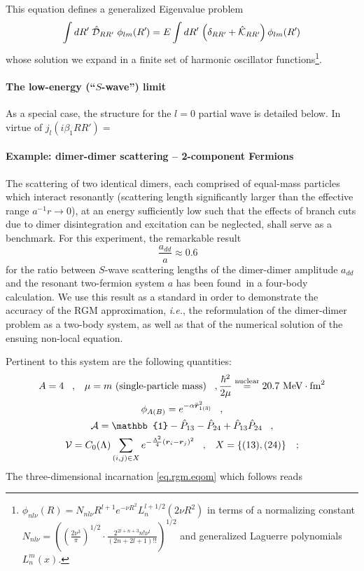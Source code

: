 \documentclass[onecolumn,preprint,superscriptaddress,nofootinbib,notitlepage,10pt,linenumbers]{revtex4-1}
\newcommand*{\mprime}{^{\prime}\mkern-1.2mu}
\newcommand{\la}{\label}
\newcommand{\be}{\begin{equation}}
\newcommand{\ee}{\end{equation}}
\newcommand{\vcl}[1]{\ensuremath{\bar{\boldsymbol{r}}_\text{\tiny #1}}}
\newcommand{\ie}{\textit{i.e.}\;}
\newcommand{\ve}[1]{\ensuremath{\boldsymbol{#1}}}
\newcommand{\cc}{\ensuremath C_0(\Lambda)}
\begin{document}
This equation defines a generalized Eigenvalue problem
\be\la{eq.rgm.gev}
\int dR\mprime~\hat{\mathcal{D}}_{RR\mprime}~\phi_{lm}(R\mprime)=
E\int dR\mprime\,\left(\delta_{RR\mprime}+\hat{\mathcal{K}}_{RR\mprime}\right)
\phi_{lm}(R\mprime)
\ee
whose solution we expand in a finite set of harmonic oscillator
functions\footnote{
$\phi_{nl\nu}(R)=N_{nl\nu}R^{l+1}e^{-\nu R^2}L_{n}^{l+1/2}(2\nu R^2)$
in terms of a normalizing constant $N_{nl\nu}=
\left(\left(\frac{2\nu^3}{\pi}\right)^{1/2}\cdot\frac{2^{2l+n+3}n!\nu^l}{(2n+2l+1)!!}\right)^{1/2}$ and generalized
Laguerre polynomials $L_n^m(x)$.
}.

\paragraph{The low-energy (``$S$-wave'') limit}
As a special case, the structure for the $l=0$ partial wave is detailed below. In virtue of $j_{l}(i\beta_1 RR')=$

\newpage
\paragraph{Example: dimer-dimer scattering -- 2-component Fermions}
The scattering of two identical dimers, each comprised of equal-mass particles which interact resonantly (scattering length significantly larger
than the effective range $a^{-1}r\to 0$), at an energy sufficiently low such that the effects of branch cuts due to dimer disintegration and
excitation can be neglected, shall serve as a benchmark. For this experiment, the remarkable result
\be
\frac{a_{dd}}{a}\approx 0.6\;\;\;
\ee
for the ratio between $S$-wave scattering
lengths of the dimer-dimer amplitude $a_{dd}$ and the resonant two-fermion system $a$ has been found\cite{petrov_dimerov}~in
a four-body calculation.
We use this result as a standard in order to demonstrate the accuracy of the RGM approximation, \ie, the reformulation of the dimer-dimer
problem as a two-body system, as well as that of the numerical solution of the ensuing non-local equation.

Pertinent to this system are the following quantities:
\begin{gather}
A=4\;\;\;,\;\;\;\mu=m~\text{(single-particle mass)}\;\;\;,\frac{\hbar^2}{2\mu}\stackrel{\text{nuclear}}{=}20.7~\text{MeV}\cdot\text{fm}^2\\
\phi_{A(B)}=e^{-\alpha\vcl{1(3)}^2}\;\;\;,\\
\mathcal{A}=\mathbb{1}-\hat{P}_{13}-\hat{P}_{24}+\hat{P}_{13}\hat{P}_{24}\;\;\;,\\
\mathcal{V}=\cc\sum_{(i,j)\in X}e^{-\frac{\Lambda^2}{4}(\ve{r}_i-\ve{r}_j)^2}\;\;\;,\;\;\;X=\left\lbrace(13),(24)\right\rbrace\;\;\;;
\end{gather}
The three-dimensional incarnation \eqref{eq.rgm.eqom} which follows reads
\end{document}
